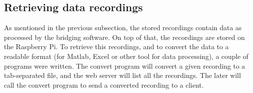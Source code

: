 \subsection{Retrieving data recordings}

As mentioned in the previous subsection, the stored recordings contain data as processed by the bridging software. On top of that, the recordings are stored on the Raspberry Pi. To retrieve this recordings, and to convert the data to a readable format (for Matlab, Excel or other tool for data processing), a couple of programs were written. The convert program will convert a given recording to a tab-separated file, and the web server will list all the recordings. The later will call the convert program to send a converted recording to a client.